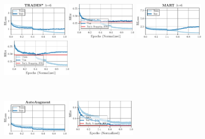 \begin{figure}[t]
\begin{minipage}[t]{0.19\textwidth}
		\includegraphics[height=1.8cm]{plots_supp_training_curves_trades6_loss}
		
		\hspace*{-0.25cm}
		\includegraphics[height=1.8cm]{plots_supp_training_curves_trades6_error}
	\end{minipage}
	\begin{minipage}[t]{0.19\textwidth}
		\vspace*{0px}
		
		\includegraphics[height=1.8cm]{plots_supp_training_curves_mart6_loss}
		
		\hspace*{-0.25cm}
		\includegraphics[height=1.8cm]{plots_supp_training_curves_mart6_error}
	\end{minipage}
	\\[2.5px]
	
	\begin{minipage}[t]{0.19\textwidth}
		\vspace*{0px}
		
		\includegraphics[height=1.8cm]{plots_supp_training_curves_aa_loss}
		
		\hspace*{-0.15cm}
		\includegraphics[height=1.8cm]{plots_supp_training_curves_aa_error}
	\end{minipage}
	\begin{minipage}[t]{0.19\textwidth}
		\vspace*{0px}
		

\end{minipage}
\end{figure}
